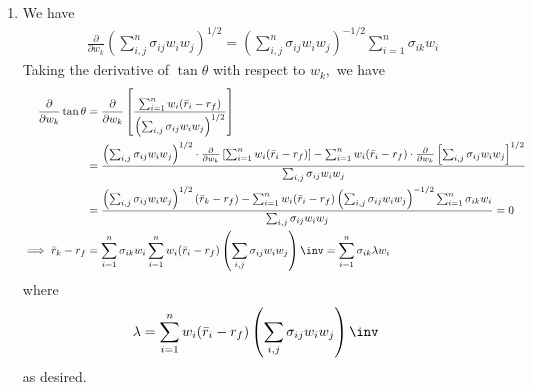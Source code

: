 \documentclass{article}
\begin{document}
\begin{enumerate}
\begin{enumerate}[(a)]
		\end{enumerate}

	\item 
		\begin{soln}
			We have
			\begin{align*}
				\frac{\partial}{\partial w_k}\left( \sum_{i, j}^{n} \sigma_{ij}w_i w_j \right)^{1/2} = \left( \sum_{i, j}^{n} \sigma_{ij}w_iw_j \right)^{-1/2} \sum_{i=1}^{n} \sigma_{ik} w_i
			\end{align*}
			Taking the derivative of $\tan \theta$ with respect to $w_k,$ we have
			\begin{align*}
				\frac{\partial}{\partial w_k} \tan \theta &= \frac{\partial}{\partial w_k} \left[\frac{\sum_{i=1}^{n} w_i(\bar r_i-r_f)}{\left( \sum_{i, j}^{}\sigma_{ij}w_iw_j \right)^{1/2}}\right] \\
				&= \frac{\left( \sum_{i, j}^{}\sigma_{ij}w_iw_j \right)^{1/2}\cdot \frac{\partial}{\partial w_k}\left[ \sum_{i=1}^{n} w_i(\bar r_i-r_f) \right] - \sum_{i=1}^{n} w_i(\bar r_i-r_f) \cdot \frac{\partial}{\partial w_k}\left[ \sum_{i, j}^{}\sigma_{ij}w_iw_j \right]^{1/2}}{\sum_{i, j}^{}\sigma_{ij}w_iw_j} \\
				&= \frac{\left(\sum_{i, j}^{}\sigma_{ij}w_iw_j\right)^{1/2}(\bar r_k-r_f) - \sum_{i=1}^{n} w_i(\bar r_i-r_f) \left(\sum_{i, j}^{}\sigma_{ij}w_iw_j\right)^{-1/2} \sum_{i=1}^{n} \sigma_{ik}w_i}{\sum_{i, j}^{}\sigma_{ij}w_iw_j} = 0 \\
				\implies \bar r_k -r_f &= \sum_{i=1}^{n} \sigma_{ik}w_i \sum_{i=1}^{n} w_i(\bar r_i-r_f)\left( \sum_{i, j}^{}\sigma_{ij}w_iw_j \right)\inv = \sum_{i=1}^{n} \sigma_{ik} \lambda w_i
			\end{align*}
			where
			\begin{align*}
				\lambda &= \sum_{i=1}^{n} w_i(\bar r_i-r_f) \left( \sum_{i, j}^{}\sigma_{ij}w_iw_j \right)\inv
			\end{align*}
			as desired.
		\end{soln}
\end{enumerate}
\end{document}
